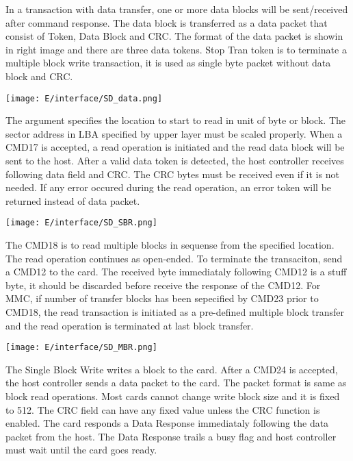 \secup

\secdown


In a transaction with data transfer, one or more data blocks will be
sent/received after command response. The data block is transferred as a data
packet that consist of Token, Data Block and CRC. The format of the data packet
is showin in right image and there are three data tokens. Stop Tran token is to
terminate a multiple block write transaction, it is used as single byte packet
without data block and CRC.

\bigskip
\noindent\texttt{[image: E/interface/SD\_data.png]}
\bigskip


The argument specifies the location to start to read in unit of byte or block.
The sector address in LBA specified by upper layer must be scaled properly. When
a CMD17 is accepted, a read operation is initiated and the read data block will
be sent to the host. After a valid data token is detected, the host controller
receives following data field and CRC. The CRC bytes must be received even if it
is not needed. If any error occured during the read operation, an error token
will be returned instead of data packet.

\bigskip
\noindent\texttt{[image: E/interface/SD\_SBR.png]}
\bigskip


The CMD18 is to read multiple blocks in sequense from the specified location.
The read operation continues as open-ended. To terminate the transaciton, send a
CMD12 to the card. The received byte immediataly following CMD12 is a stuff
byte, it should be discarded before receive the response of the CMD12. For MMC,
if number of transfer blocks has been sepecified by CMD23 prior to CMD18, the
read transaction is initiated as a pre-defined multiple block transfer and the
read operation is terminated at last block transfer.

\bigskip
\noindent\texttt{[image: E/interface/SD\_MBR.png]}
\bigskip


The Single Block Write writes a block to the card. After a CMD24 is accepted,
the host controller sends a data packet to the card. The packet format is same
as block read operations. Most cards cannot change write block size and it is
fixed to 512. The CRC field can have any fixed value unless the CRC function is
enabled. The card responds a Data Response immediataly following the data packet
from the host. The Data Response trails a busy flag and host controller must
wait until the card goes ready.


